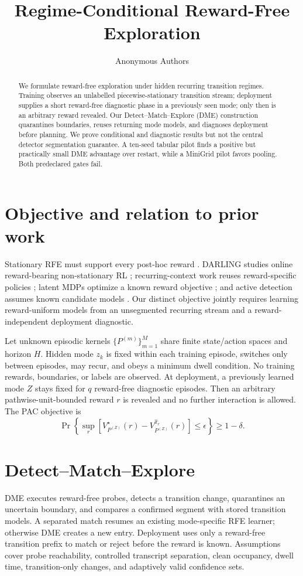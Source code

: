 \documentclass[10pt]{article}
\title{Regime-Conditional Reward-Free Exploration}
\author{Anonymous Authors}\date{}
\begin{document}
\maketitle
\begin{abstract}
We formulate reward-free exploration under hidden recurring transition
regimes. Training observes an unlabelled piecewise-stationary transition
stream; deployment supplies a short reward-free diagnostic phase in a
previously seen mode; only then is an arbitrary reward revealed. Our
Detect--Match--Explore (DME) construction quarantines boundaries, reuses
returning mode models, and diagnoses deployment before planning. We prove
conditional and diagnostic results but not the central detector segmentation
guarantee. A ten-seed tabular pilot finds a positive but practically small DME
advantage over restart, while a MiniGrid pilot favors pooling. Both
predeclared gates fail.
\end{abstract}

\section{Objective and relation to prior work}
Stationary RFE must support every post-hoc reward
\citep{jin2020rewardfree,kaufmann2021adaptive,zhang2021nearly}. DARLING studies
online reward-bearing non-stationary RL \citep{gerogiannis2026darling};
recurring-context work reuses reward-specific policies
\citep{alegre2021minimum}; latent MDPs optimize a known reward objective
\citep{kwon2021latent}; and active detection assumes known candidate models
\citep{duan2021detection}. Our distinct objective jointly requires learning
reward-uniform models from an unsegmented recurring stream and a
reward-independent deployment diagnostic.

Let unknown episodic kernels $\{P^{(m)}\}_{m=1}^M$ share finite state/action
spaces and horizon $H$. Hidden mode $z_k$ is fixed within each training episode,
switches only between episodes, may recur, and obeys a minimum dwell condition.
No training rewards, boundaries, or labels are observed. At deployment, a
previously learned mode $Z$ stays fixed for $q$ reward-free diagnostic episodes.
Then an arbitrary pathwise-unit-bounded reward $r$ is revealed and no further
interaction is allowed. The PAC objective is
\[
\Pr\!\left\{\sup_r[V^\star_{P^{(Z)}}(r)-
V^{\widehat\pi_r}_{P^{(Z)}}(r)]\le\epsilon\right\}\ge1-\delta .
\]

\section{Detect--Match--Explore}
DME executes reward-free probes, detects a transition change, quarantines an
uncertain boundary, and compares a confirmed segment with stored transition
models. A separated match resumes an existing mode-specific RFE learner;
otherwise DME creates a new entry. Deployment uses only a reward-free
transition prefix to match or reject before the reward is known. Assumptions
cover probe reachability, controlled transcript separation, clean occupancy,
dwell time, transition-only changes, and adaptively valid confidence sets.
\end{document}
